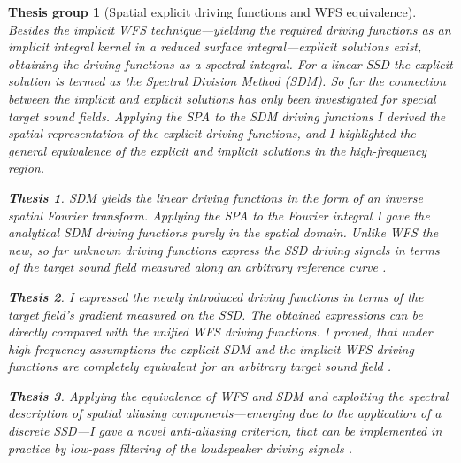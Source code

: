 \documentclass[10pt,twoside]{article}
\theoremstyle{thesisgroupstyle}
\newtheorem{thesisgroup}{Thesis group}
\theoremstyle{indented}
\newtheorem{thesis}{Thesis}[thesisgroup]
\begin{document}
\begin{thesisgroup}[Spatial explicit driving functions and WFS equivalence]
Besides the implicit WFS technique---yielding the required driving functions as an implicit integral kernel in a reduced surface integral---explicit solutions exist, obtaining the driving functions as a spectral integral.
For a linear SSD the explicit solution is termed as the \emph{Spectral Division Method (SDM)}.
So far the connection between the implicit and explicit solutions has only been investigated for special target sound fields.
Applying the SPA to the SDM driving functions I derived the spatial representation of the explicit driving functions, and I highlighted the general equivalence of the explicit and implicit solutions in the high-frequency region. \cite{Firtha2017:daga_booklet, Firtha2018:WFS_vs_SDM_booklet}
\begin{thesis}
SDM yields the linear driving functions in the form of an inverse spatial Fourier transform.
Applying the SPA to the Fourier integral I gave the analytical SDM driving functions purely in the spatial domain.
Unlike WFS the new, so far unknown driving functions express the SSD driving signals in terms of the target sound field measured along an arbitrary reference curve \cite{Firtha2017:daga_booklet}.\end{thesis}
\begin{thesis}
I expressed the newly introduced driving functions in terms of the target field's gradient measured on the SSD.
The obtained expressions can be directly compared with the unified WFS driving functions.
I proved, that under high-frequency assumptions the explicit SDM and the implicit WFS driving functions are completely equivalent for an arbitrary target sound field \cite{Firtha2018:WFS_vs_SDM_booklet}.\end{thesis}
\begin{thesis}
Applying the equivalence of WFS and SDM and exploiting the spectral description of spatial aliasing components---emerging due to the application of a discrete SSD---I gave 
a novel anti-aliasing criterion, that can be implemented in practice by low-pass filtering of the loudspeaker driving signals \cite{Firtha2018_daga_a_booklet}.
\end{thesis}
\end{thesisgroup}
\end{document}
